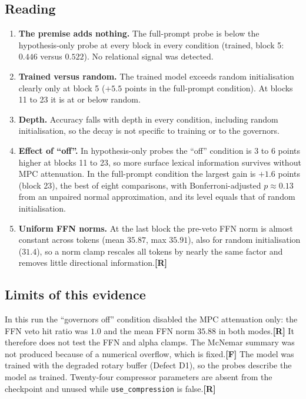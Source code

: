 \documentclass[11pt,a4paper]{article}
\newcommand{\sR}{\textbf{[R]}}
\newcommand{\sF}{\textbf{[F]}}
\begin{document}
\subsection{Reading}
\begin{enumerate}[leftmargin=*]
    \item \textbf{The premise adds nothing.} The full-prompt probe is below the hypothesis-only probe at every block in every condition (trained, block 5: $0.446$ versus $0.522$). No relational signal was detected.
    \item \textbf{Trained versus random.} The trained model exceeds random initialisation clearly only at block 5 ($+5.5$ points in the full-prompt condition). At blocks 11 to 23 it is at or below random.
    \item \textbf{Depth.} Accuracy falls with depth in every condition, including random initialisation, so the decay is not specific to training or to the governors.
    \item \textbf{Effect of ``off''.} In hypothesis-only probes the ``off'' condition is $3$ to $6$ points higher at blocks 11 to 23, so more surface lexical information survives without MPC attenuation. In the full-prompt condition the largest gain is $+1.6$ points (block 23), the best of eight comparisons, with Bonferroni-adjusted $p \approx 0.13$ from an unpaired normal approximation, and its level equals that of random initialisation.
    \item \textbf{Uniform FFN norms.} At the last block the pre-veto FFN norm is almost constant across tokens (mean $35.87$, max $35.91$), also for random initialisation ($31.4$), so a norm clamp rescales all tokens by nearly the same factor and removes little directional information.\sR{}
\end{enumerate}

\subsection{Limits of this evidence}
In this run the ``governors off'' condition disabled the MPC attenuation only: the FFN veto hit ratio was $1.0$ and the mean FFN norm $35.88$ in both modes.\sR{} It therefore does not test the FFN and alpha clamps. The McNemar summary was not produced because of a numerical overflow, which is fixed.\sF{} The model was trained with the degraded rotary buffer (Defect D1), so the probes describe the model as trained. Twenty-four compressor parameters are absent from the checkpoint and unused while \texttt{use\_compression} is false.\sR{}
\end{document}
